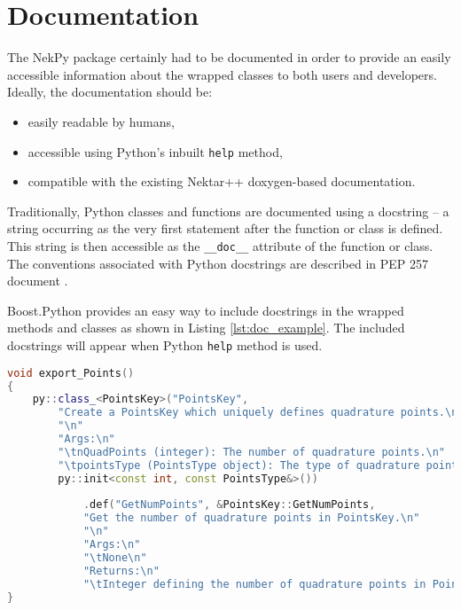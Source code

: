 \chapter{Documentation}

The NekPy package certainly had to be documented in order to provide an easily accessible 
information about the wrapped classes to both users and developers. Ideally, the documentation should be:
\begin{itemize}
    \item easily readable by humans,
    \item accessible using Python's inbuilt \texttt{help} method,
    \item compatible with the existing Nektar++ doxygen-based documentation.
\end{itemize}

Traditionally, Python classes and functions are documented using a docstring -- a string occurring 
as the very first statement after the function or class is defined. This string is then accessible 
as the \texttt{\_\_doc\_\_} attribute of the function or class. The conventions associated with 
Python docstrings are described in PEP 257 document \cite{PEP257}.

Boost.Python provides an easy way to include docstrings in the wrapped methods and classes as 
shown in Listing \ref{lst:doc_example}. The included docstrings will appear when Python 
\texttt{help} method is used.

\begin{lstlisting}[caption={Example of class and method documentation in Boost.Python}, label={lst:doc_example}, language=C++]
void export_Points()
{
	py::class_<PointsKey>("PointsKey", 
        "Create a PointsKey which uniquely defines quadrature points.\n"
        "\n"
        "Args:\n"
        "\tnQuadPoints (integer): The number of quadrature points.\n"
        "\tpointsType (PointsType object): The type of quadrature points.",
        py::init<const int, const PointsType&>())
        	
            .def("GetNumPoints", &PointsKey::GetNumPoints,
            "Get the number of quadrature points in PointsKey.\n"
            "\n"
            "Args:\n"
            "\tNone\n"
            "Returns:\n"
            "\tInteger defining the number of quadrature points in PointsKey.")
}
\end{lstlisting}

